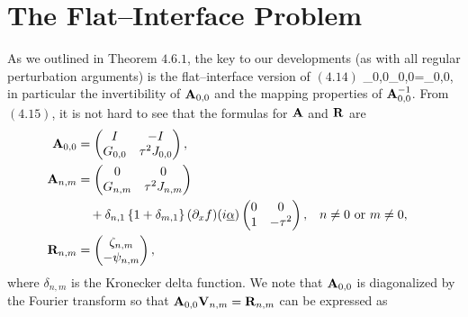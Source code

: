 \section{The Flat--Interface Problem}
\label{Sec:Flat Interface}
As we outlined in Theorem $4.6.1$, the key to our developments (as with all regular perturbation arguments) is the flat--interface version of $(4.14)$
\bes
\bA_{0,0}\bV_{0,0}=\bR_{0,0},
\ees
in particular the invertibility of $\mathbf{A}_{0,0}$ and the mapping properties of $\mathbf{A}_{0,0}^{-1}$. From $(4.15)$, it is not hard to see that the formulas for $\mathbf{A}$ and $\mathbf{R}$ are 
\begin{subequations}
\label{Eqn:An:Rn}
\begin{align}
\mathbf{A}_{0,0} & = \begin{pmatrix} I & -I \\ G_{0,0} & \tau^2 J_{0,0} \end{pmatrix}, \\
\mathbf{A}_{n,m} & = \begin{pmatrix} 0 & 0 \\ G_{n,m} & \tau^2 J_{n,m} \end{pmatrix} 
  \notag \\
  & \quad + \delta_{n,1} \left\{ 1 + \delta_{m,1} \right\} (\partial_x f) (i \underline{\alpha})  
  \begin{pmatrix} 0 & 0 \\ 1 & -\tau^2 \end{pmatrix},
  && \text{$n \neq 0$ or $m \neq 0$}, \\
\mathbf{R}_{n,m} & = \begin{pmatrix} \zeta_{n,m} \\ -\psi_{n,m} \end{pmatrix},
\end{align}
\end{subequations}
where $\delta_{n,m}$ is the Kronecker delta function. We note that $\mathbf{A}_{0,0}$ is diagonalized by
the Fourier transform so that $\mathbf{A}_{0,0} \mathbf{V}_{n,m} = \mathbf{R}_{n,m}$
can be expressed as

